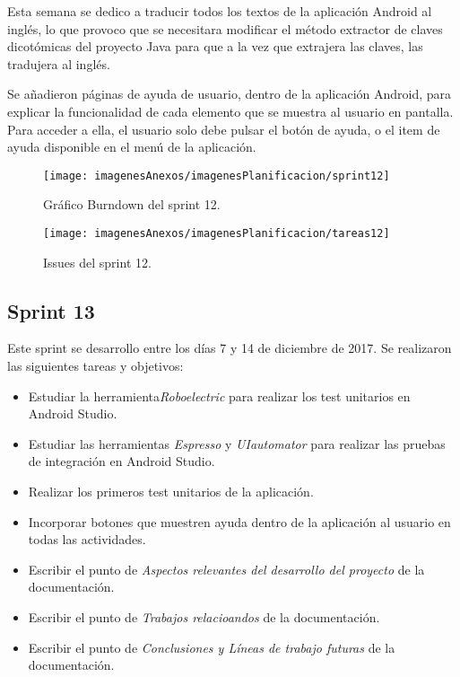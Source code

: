 Esta semana se dedico a traducir todos los textos de la aplicación Android al inglés, lo que provoco que se necesitara modificar el método extractor de claves dicotómicas del proyecto Java para que a la vez que extrajera las claves, las tradujera al inglés.

Se añadieron páginas de ayuda de usuario, dentro de la aplicación Android, para explicar la funcionalidad de cada elemento que se muestra al usuario en pantalla. Para acceder a ella, el usuario solo debe pulsar el botón de ayuda, o el item de ayuda disponible en el menú de la aplicación.

\begin{figure}[h]
    \begin{center}%
        \begin{center}%
          \texttt{[image: imagenesAnexos/imagenesPlanificacion/sprint12]}%
          \caption{Gráfico Burndown del sprint 12.}%
          \label{figSprint12}%
        \end{center}%
  	\end{center}%
\end{figure}%

\begin{figure}[h]
    \begin{center}%
        \begin{center}%
          \texttt{[image: imagenesAnexos/imagenesPlanificacion/tareas12]}%
          \caption{Issues del sprint 12.}%
          \label{figTareas12}%
        \end{center}%
  	\end{center}%
\end{figure}%

\newpage

\subsection{Sprint 13}

Este sprint se desarrollo entre los días 7 y 14 de diciembre de 2017. Se realizaron las siguientes tareas y objetivos:

\begin{itemize}
	\item Estudiar la herramienta\textit{Roboelectric} para realizar los test unitarios en Android Studio.
	\item Estudiar las herramientas \textit{Espresso} y \textit{UIautomator} para realizar las pruebas de integración en Android Studio. 
	\item Realizar los primeros test unitarios de la aplicación.
	\item Incorporar botones que muestren ayuda dentro de la aplicación al usuario en todas las actividades.
	\item Escribir el punto de \textit{Aspectos relevantes del desarrollo
del proyecto} de la documentación.
	\item Escribir el punto de \textit{Trabajos relacioandos} de la documentación.
	\item Escribir el punto de \textit{Conclusiones y Líneas de trabajo
futuras} de la documentación.
\end{itemize}

